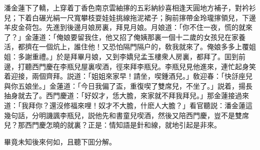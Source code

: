 潘金蓮下了轎，上穿着丁香色南京雲紬㩟的五彩納紗喜相逢天圓地方補子，對衿衫兒；下着白碾光絹一尺寬攀枝耍娃娃挑線拖泥裙子；胸前㩟帶金玲瓏㩟領兒，下邊羊皮金荷包。先進到後邊月娘房裏，拜見月娘。月娘道：「你不住一夜，慌的就來了？」金蓮道：「俺娘要留我住，他又招了俺姨那裏一個十二歲的女孩兒在家養活，都擠在一個炕上，誰住他！又恐怕隔門隔户的，敎我就來了。俺娘多多上覆姐姐：多謝重禮。」於是拜畢月娘，又到李嬌兒孟玉樓衆人房裏，都拜了。囬到前邊，打聽西門慶在李瓶兒屋裏喫酒，徑來拜李瓶兒。李瓶兒見他進來，連忙起身笑着迎接，兩個齊拜。説道：「姐姐來家早！請坐，喫鍾酒兒。」敎迎春：「快㧱座兒與你五娘坐。」金蓮道：「今日我偏了盃，重復喫了雙席兒，不坐了。」説着，揚長抽身就去了。西門慶道：「好奴才，恁大膽，來家就不拜我拜兒。」那金蓮接過來道：「我拜你？還沒修福來哩！奴才不大膽，什麽人大膽？」看官聽説：潘金蓮這幾句話，分明譏諷李瓶兒，説他先和書童兒喫酒，然後又陪西門慶，豈不是雙席兒？那西門慶怎曉的就裏？正是：情知語是針和線，就地引起是非來。

畢竟未知後來何如，且聽下囬分解。

